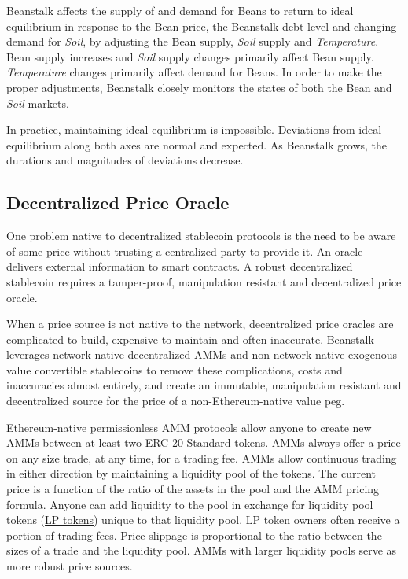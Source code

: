 \documentclass[tikz]{article}
\newcommand{\term}[1]{\textsl{#1}}
\begin{document}
Beanstalk affects the supply of and demand for Beans to return to ideal equilibrium in response to the Bean price, the Beanstalk debt level and changing demand for \term{Soil}, by adjusting the Bean supply, \term{Soil} supply and \term{Temperature}. Bean supply increases and \term{Soil} supply changes primarily affect Bean supply. \term{Temperature} changes primarily affect demand for Beans. In order to make the proper adjustments, Beanstalk closely monitors the states of both the Bean and \term{Soil} markets.

In practice, maintaining ideal equilibrium is impossible. Deviations from ideal equilibrium along both axes are normal and expected. As Beanstalk grows, the durations and magnitudes of deviations decrease. 


\vspace*{2mm}
\subsection{Decentralized Price Oracle}
\vspace*{2mm}

One problem native to decentralized stablecoin protocols is the need to be aware of some price without trusting a centralized party to provide it. An oracle delivers external information to smart contracts. A robust decentralized stablecoin requires a tamper-proof, manipulation resistant and decentralized price oracle.

When a price source is not native to the network, decentralized price oracles are complicated to build, expensive to maintain and often inaccurate. Beanstalk leverages network-native decentralized AMMs and non-network-native exogenous value convertible stablecoins to remove these complications, costs and inaccuracies almost entirely, and create an immutable, manipulation resistant and decentralized source for the price of a non-Ethereum-native value peg.

Ethereum-native permissionless AMM protocols allow anyone to create new AMMs between at least two ERC-20 Standard tokens. AMMs always offer a price on any size trade, at any time, for a trading fee. AMMs allow continuous trading in either direction by maintaining a liquidity pool of the tokens. The current price is a function of the ratio of the assets in the pool and the AMM pricing formula. Anyone can add liquidity to the pool in exchange for liquidity pool tokens (\hyperlink{LP tokens}{LP tokens}) unique to that liquidity pool. LP token owners often receive a portion of trading fees. Price slippage is proportional to the ratio between the sizes of a trade and the liquidity pool. AMMs with larger liquidity pools serve as more robust price sources.
\end{document}
